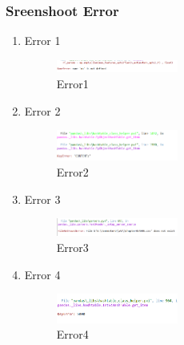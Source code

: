         \subsubsection{Sreenshoot Error}
        \begin{enumerate}
            \item Error 1
            \begin{figure}[H]
                \includegraphics[width=4cm]{figures/1174086/chapter4/errtype1.png}
                \centering
                \caption{Error1}
            \end{figure}
            \item Error 2
            \begin{figure}[H]
                \includegraphics[width=4cm]{figures/1174086/chapter4/errtype2.png}
                \centering
                \caption{Error2}
            \end{figure}
            \item Error 3
            \begin{figure}[H]
                \includegraphics[width=4cm]{figures/1174086/chapter4/errtype3.png}
                \centering
                \caption{Error3}
            \end{figure}
            \item Error 4
            \begin{figure}[H]
                \includegraphics[width=4cm]{figures/1174086/chapter4/errtype4.png}
                \centering
                \caption{Error4}
            \end{figure}
        \end{enumerate}
